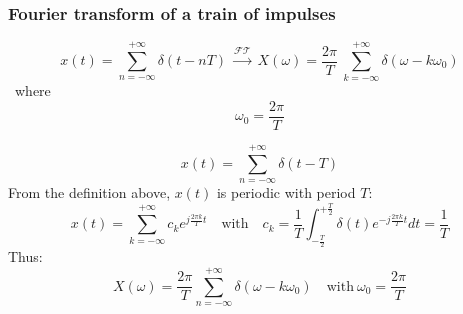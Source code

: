 \subsubsection{Fourier transform of a train of impulses}
\[ 
x(t) = \sum_{n=-\infty}^{+\infty} \delta(t-nT) \ \xrightarrow{\mathcal{FT}}\ X(\omega)=\frac{2\pi}{T}  \ \sum^{+\infty}_{k=-\infty} \delta(\omega-k\omega_{0}) \]
\ where \[ \omega_{0}=\frac{2\pi}{T} 
\]

\begin{dv}{}
    \[ x(t) = \sum_{n=-\infty}^{+\infty} \delta(t-T) \]
    From the definition above, $x(t)$ is periodic with period $T$:
    \[ x(t) = \sum_{k=-\infty}^{+\infty}c_{k}e^{j \frac{2\pi k}{T}t} \quad \text{with} \quad c_{k} = \frac{1}{T} \int_{-\frac{T}{2}}^{+\frac{T}{2}} \delta(t)e^{-j \frac{2\pi k}{T}t} dt = \frac{1}{T} \]
    Thus:
    \[ X(\omega) = \frac{2\pi}{T}\sum_{n=-\infty}^{+\infty}  \delta(\omega-k\omega_{0}) \quad  \text{with}\  \omega_{0}=\frac{2\pi}{T}\]
\end{dv}